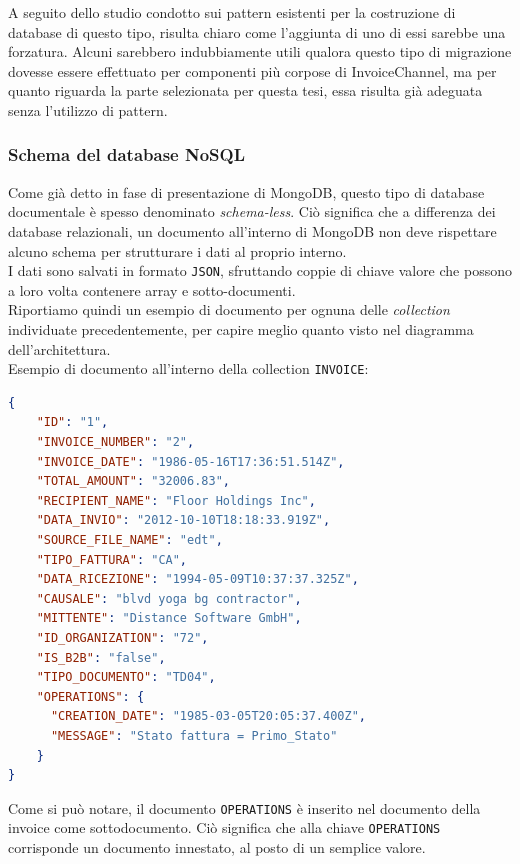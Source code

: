 \noindent A seguito dello studio condotto sui pattern esistenti per la costruzione di database di questo tipo, risulta chiaro come l'aggiunta di uno di essi sarebbe una forzatura. Alcuni sarebbero indubbiamente utili qualora questo tipo di migrazione dovesse essere effettuato per componenti più corpose di InvoiceChannel, ma per quanto riguarda la parte selezionata per questa tesi, essa risulta già adeguata senza l'utilizzo di pattern.

\subsubsection{Schema del database NoSQL}
Come già detto in fase di presentazione di MongoDB, questo tipo di database documentale è spesso denominato \textit{schema-less}. Ciò significa che a differenza dei database relazionali, un documento all'interno di MongoDB non deve rispettare alcuno schema per strutturare i dati al proprio interno.\\
I dati sono salvati in formato \texttt{JSON}, sfruttando coppie di chiave valore che possono a loro volta contenere array e sotto-documenti.\\
Riportiamo quindi un esempio di documento per ognuna delle \textit{collection} individuate precedentemente, per capire meglio quanto visto nel diagramma dell'architettura.\\

\noindent Esempio di documento all'interno della collection \texttt{INVOICE}:
\begin{lstlisting}[language=json,
        deletekeywords={IDENTITY,INT},
        morekeywords={clustered},    
        framesep=10pt,
        framextopmargin=10pt]
{
    "ID": "1",
    "INVOICE_NUMBER": "2",
    "INVOICE_DATE": "1986-05-16T17:36:51.514Z",
    "TOTAL_AMOUNT": "32006.83",
    "RECIPIENT_NAME": "Floor Holdings Inc",
    "DATA_INVIO": "2012-10-10T18:18:33.919Z",
    "SOURCE_FILE_NAME": "edt",
    "TIPO_FATTURA": "CA",
    "DATA_RICEZIONE": "1994-05-09T10:37:37.325Z",
    "CAUSALE": "blvd yoga bg contractor",
    "MITTENTE": "Distance Software GmbH",
    "ID_ORGANIZATION": "72",
    "IS_B2B": "false",
    "TIPO_DOCUMENTO": "TD04",
    "OPERATIONS": {
      "CREATION_DATE": "1985-03-05T20:05:37.400Z",
      "MESSAGE": "Stato fattura = Primo_Stato"
    }
}
\end{lstlisting}
\noindent Come si può notare, il documento \texttt{OPERATIONS} è inserito nel documento della invoice come sottodocumento. Ciò significa che alla chiave \texttt{OPERATIONS} corrisponde un documento innestato, al posto di un semplice valore.\\

